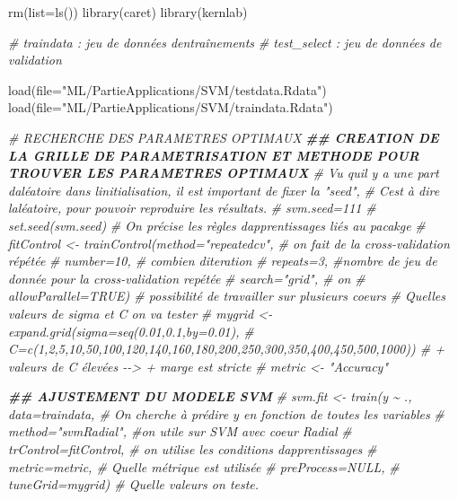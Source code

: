 \documentclass[
]{article}
\newenvironment{Shaded}{\begin{snugshade}}{\end{snugshade}}
\newcommand{\AttributeTok}[1]{\textcolor[rgb]{0.77,0.63,0.00}{#1}}
\newcommand{\CommentTok}[1]{\textcolor[rgb]{0.56,0.35,0.01}{\textit{#1}}}
\newcommand{\DocumentationTok}[1]{\textcolor[rgb]{0.56,0.35,0.01}{\textbf{\textit{#1}}}}
\newcommand{\FunctionTok}[1]{\textcolor[rgb]{0.00,0.00,0.00}{#1}}
\newcommand{\NormalTok}[1]{#1}
\newcommand{\StringTok}[1]{\textcolor[rgb]{0.31,0.60,0.02}{#1}}
\begin{document}
\begin{Shaded}
\begin{Highlighting}[]
\FunctionTok{rm}\NormalTok{(}\AttributeTok{list=}\FunctionTok{ls}\NormalTok{())}
\FunctionTok{library}\NormalTok{(caret)}
\FunctionTok{library}\NormalTok{(kernlab)}

\CommentTok{\# traindata : jeu de données d\textquotesingle{}entraînements}
\CommentTok{\# test\_select : jeu de données de validation}

\FunctionTok{load}\NormalTok{(}\AttributeTok{file=}\StringTok{"ML/PartieApplications/SVM/testdata.Rdata"}\NormalTok{)}
\FunctionTok{load}\NormalTok{(}\AttributeTok{file=}\StringTok{"ML/PartieApplications/SVM/traindata.Rdata"}\NormalTok{)}


\CommentTok{\#  RECHERCHE DES PARAMETRES OPTIMAUX}
\DocumentationTok{\#\#  CREATION DE LA GRILLE DE PARAMETRISATION ET METHODE POUR TROUVER LES PARAMETRES OPTIMAUX}
\CommentTok{\# Vu qu\textquotesingle{}il y a une part d\textquotesingle{}aléatoire dans l\textquotesingle{}initialisation, il est important de fixer la "seed",}
\CommentTok{\# C\textquotesingle{}est à dire l\textquotesingle{}aléatoire, pour pouvoir reproduire les résultats.}
\CommentTok{\# svm.seed=111}
\CommentTok{\# set.seed(svm.seed)}
\CommentTok{\# On précise les règles d\textquotesingle{}apprentissages liés au pacakge}
\CommentTok{\# fitControl \textless{}{-} trainControl(method="repeatedcv", \# on fait de la cross{-}validation répétée}
\CommentTok{\#                            number=10, \# combien d\textquotesingle{}iteration}
\CommentTok{\#                            repeats=3, \#nombre de jeu de donnée pour la cross{-}validation repétée}
\CommentTok{\#                            search="grid", \# on}
\CommentTok{\#                            allowParallel=TRUE) \# possibilité de travailler sur plusieurs coeurs}
\CommentTok{\# Quelles valeurs de sigma et C on va tester}
\CommentTok{\# mygrid \textless{}{-} expand.grid(sigma=seq(0.01,0.1,by=0.01),}
\CommentTok{\#                       C=c(1,2,5,10,50,100,120,140,160,180,200,250,300,350,400,450,500,1000)) \# + valeurs de C élevées {-}{-}\textgreater{} + marge est stricte}
\CommentTok{\# metric \textless{}{-} "Accuracy"}

\DocumentationTok{\#\#  AJUSTEMENT DU MODELE SVM}
\CommentTok{\# svm.fit \textless{}{-} train(y \textasciitilde{} ., data=traindata, \# On cherche à prédire y en fonction de toutes les variables}
\CommentTok{\#                  method="svmRadial", \#on utile sur SVM avec coeur Radial}
\CommentTok{\#                  trControl=fitControl, \# on utilise les conditions d\textquotesingle{}apprentissages}
\CommentTok{\#                  metric=metric, \# Quelle métrique est utilisée}
\CommentTok{\#                  preProcess=NULL,}
\CommentTok{\#                  tuneGrid=mygrid) \# Quelle valeurs on teste.}



\end{Highlighting}
\end{Shaded}
\end{document}
